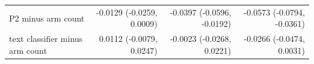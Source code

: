 \begin{tabular}{lrrr}
P2 minus arm count & -0.0129 (-0.0259, 0.0009) & -0.0397 (-0.0596, -0.0192) & -0.0573 (-0.0794, -0.0361) \\
text classifier minus arm count & 0.0112 (-0.0079, 0.0247) & -0.0023 (-0.0268, 0.0221) & -0.0266 (-0.0474, 0.0031) \\

\end{tabular}
